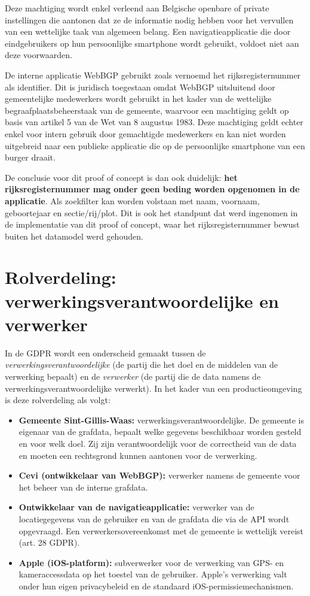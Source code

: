 Deze machtiging wordt enkel verleend aan Belgische openbare of private instellingen die aantonen dat ze de informatie nodig hebben voor het vervullen van een wettelijke taak van algemeen belang. Een navigatieapplicatie die door eindgebruikers op hun persoonlijke smartphone wordt gebruikt, voldoet niet aan deze voorwaarden.

De interne applicatie WebBGP gebruikt zoals vernoemd het rijksregisternummer als identifier. Dit is 
juridisch toegestaan omdat WebBGP uitsluitend door gemeentelijke medewerkers 
wordt gebruikt in het kader van de wettelijke begraafplaatsbeheerstaak van de 
gemeente, waarvoor een machtiging geldt op basis van artikel 5 van de Wet van 
8 augustus 1983. Deze machtiging geldt echter enkel voor intern gebruik door 
gemachtigde medewerkers en kan niet worden uitgebreid naar een publieke applicatie 
die op de persoonlijke smartphone van een burger draait.

De conclusie voor dit proof of concept is dan ook duidelijk: \textbf{het rijksregisternummer mag onder geen beding worden opgenomen in de applicatie}. Als zoekfilter kan worden volstaan met naam, voornaam, geboortejaar en sectie/rij/plot. Dit is ook het standpunt dat werd ingenomen in de implementatie van dit proof of concept, waar het rijksregisternummer bewust buiten het datamodel werd gehouden.

\section{Rolverdeling: verwerkingsverantwoordelijke en verwerker}

In de GDPR wordt een onderscheid gemaakt tussen de \textit{verwerkingsverantwoordelijke} (de partij die het doel en de middelen van de verwerking bepaalt) en de \textit{verwerker} (de partij die de data namens de verwerkingsverantwoordelijke verwerkt). In het kader van een productieomgeving is deze rolverdeling als volgt:

\begin{itemize}
    \item \textbf{Gemeente Sint-Gillis-Waas:} verwerkingsverantwoordelijke. De gemeente is eigenaar van de grafdata, bepaalt welke gegevens beschikbaar worden gesteld en voor welk doel. Zij zijn verantwoordelijk voor de correctheid van de data en moeten een rechtsgrond kunnen aantonen voor de verwerking.
    \item \textbf{Cevi (ontwikkelaar van WebBGP):} verwerker namens de gemeente voor het beheer van de interne grafdata.
    \item \textbf{Ontwikkelaar van de navigatieapplicatie:} verwerker van de locatiegegevens van de gebruiker en van de grafdata die via de API wordt opgevraagd. Een verwerkersovereenkomst met de gemeente is wettelijk vereist (art. 28 GDPR).
    \item \textbf{Apple (iOS-platform):} subverwerker voor de verwerking van GPS- en kameraccessdata op het toestel van de gebruiker. Apple's verwerking valt onder hun eigen privacybeleid en de standaard iOS-permissiemechanismen.
\end{itemize}

